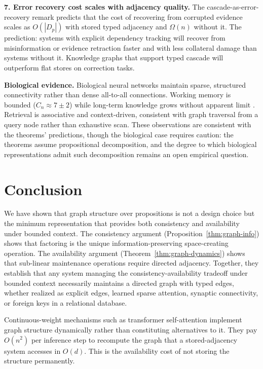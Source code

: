 \documentclass[11pt]{article}
\theoremstyle{definition}
\begin{document}
\textbf{7. Error recovery cost scales with adjacency quality.}
The cascade-as-error-recovery remark predicts that the cost of
recovering from corrupted evidence scales as $O(|D_p|)$ with stored
typed adjacency and $\Omega(n)$ without it. The prediction: systems
with explicit dependency tracking will recover from misinformation or
evidence retraction faster and with less collateral damage than systems
without it. Knowledge graphs that support typed cascade will outperform
flat stores on correction tasks.

\textbf{Biological evidence.}
Biological neural networks maintain sparse, structured connectivity
rather than dense all-to-all connections. Working memory is bounded
($C_n \approx 7 \pm 2$) while long-term knowledge grows without
apparent limit \cite{Miller1956}. Retrieval is associative and
context-driven, consistent with graph traversal from a query node
rather than exhaustive scan. These observations are consistent with
the theorems' predictions, though the biological case requires
caution: the theorems assume propositional decomposition, and the
degree to which biological representations admit such decomposition
remains an open empirical question.

\section{Conclusion}
\label{sec:conclusion}

We have shown that graph structure over propositions is not a design
choice but the minimum representation that provides both consistency
and availability under bounded context. The consistency argument
(Proposition~\ref{thm:graph-info}) shows that factoring is the unique
information-preserving space-creating operation. The availability
argument (Theorem~\ref{thm:graph-dynamics}) shows that sub-linear
maintenance operations require directed adjacency. Together, they
establish that any system managing the consistency-availability
tradeoff under bounded context necessarily maintains a directed graph
with typed edges, whether realized as explicit edges, learned sparse
attention, synaptic connectivity, or foreign keys in a relational
database.

Continuous-weight mechanisms such as transformer self-attention
implement graph structure dynamically rather than constituting
alternatives to it. They pay $O(n^2)$ per inference step to
recompute the graph that a stored-adjacency system accesses in $O(d)$.
This is the availability cost of not storing the structure permanently.
\end{document}
